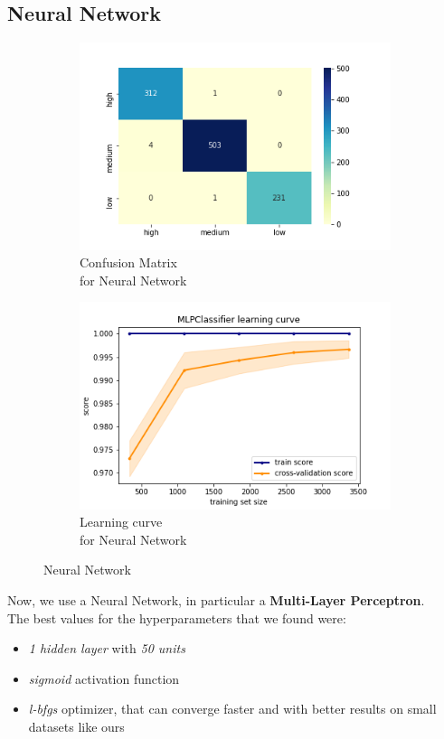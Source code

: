 \subsection{Neural Network}
\begin{figure}[h!]
     \captionsetup{justification=centering}             
     \centering
     \begin{subfigure}{0.49\textwidth}
         \centering
         \captionsetup{type=figure}
         \includegraphics[scale=0.45]{img/classification/nn_confusion.png}
         \caption{Confusion Matrix \\ for Neural Network}
         \label{fig:nn_confusion}
     \end{subfigure}
     \begin{subfigure}{0.49\textwidth}
         \centering
         \includegraphics[scale=0.45]{img/classification/nn_lc.png}
         \caption{Learning curve \\ for Neural Network}
         \label{fig:nn_lc}
     \end{subfigure}
     \caption{Neural Network}
    \label{fig:nn}
\end{figure}
Now, we use a Neural Network, in particular a \textbf{Multi-Layer Perceptron}.\\
The best values for the hyperparameters that we found were:
\begin{itemize}
\item \emph{1 hidden layer} with \emph{50 units}
\item \emph{sigmoid} activation function
\item \emph{l-bfgs} optimizer, that can converge faster and with better results on small datasets like ours
\end{itemize}

